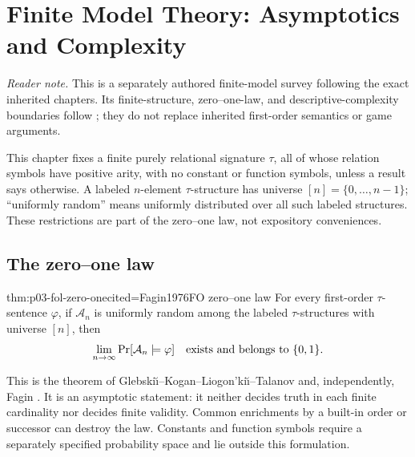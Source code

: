 
\chapter[Finite Model Theory]{Finite Model Theory: Asymptotics and Complexity}
\label{sec:p03-finite-model-theory}

\noindent\textit{Reader note.}  This is a separately authored finite-model
survey following the exact inherited chapters.  Its finite-structure,
zero--one-law, and descriptive-complexity boundaries follow
\cite{EbbinghausFlum1995,Libkin2004}; they do not replace inherited first-order
semantics or game arguments.

This chapter fixes a finite purely relational signature \(\tau\), all of whose
relation symbols have positive arity, with no constant or function symbols,
unless a result says otherwise.  A labeled
\(n\)-element \(\tau\)-structure has universe
\([n]=\{0,\ldots,n-1\}\); ``uniformly random'' means uniformly distributed
over all such labeled structures.  These restrictions are part of the
zero--one law, not expository conveniences.

\section{The zero--one law}
\label{sec:p03-zero-one-law}

\begin{hbtheorem}{thm:p03-fol-zero-one}{cited=Fagin1976}{FO zero--one law}
For every first-order \(\tau\)-sentence \(\varphi\), if \(\mathcal A_n\) is
uniformly random among the labeled \(\tau\)-structures with universe \([n]\),
then
\[
  \lim_{n\to\infty}\Pr[\mathcal A_n\models\varphi]
  \quad\text{exists and belongs to }\{0,1\}.
\]
\end{hbtheorem}

This is the theorem of Glebski\u\i--Kogan--Liogon'ki\u\i--Talanov and,
independently, Fagin \cite{GlebskiiEtAl1969,Fagin1976,Libkin2004}.  It is an
asymptotic statement: it neither decides truth in each finite cardinality nor
decides finite validity.  Common enrichments by a built-in order or successor
can destroy the law.  Constants and function symbols require a separately
specified probability space and lie outside this formulation.

